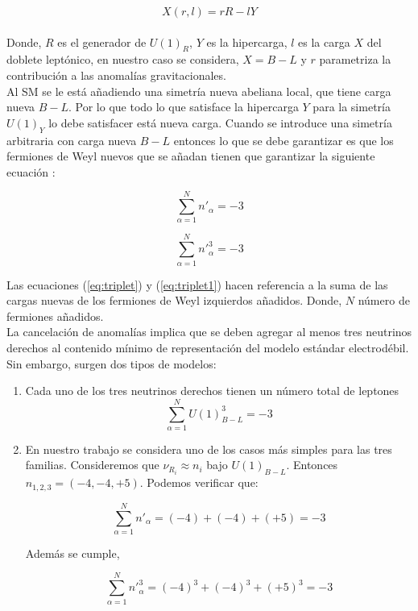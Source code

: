 \documentclass[12pt]{article}
\begin{document}
\begin{equation}
 X (r,l)=rR-lY   
\end{equation} \\

Donde, $R$ es el generador de $U(1)_R$, $Y $ es la hipercarga, $l$ es la carga $X$ del doblete leptónico, en nuestro caso se considera, $X={B-L}$ y $r$ parametriza la contribución a las anomalías gravitacionales. \\

Al SM se le está añadiendo una simetría nueva abeliana local, que tiene carga nueva ${B-L}$. Por lo que todo lo que satisface la hipercarga ${Y}$ para la simetría $U(1)_Y$ lo debe satisfacer está nueva carga. Cuando se introduce una simetría arbitraria con carga nueva ${B-L}$ entonces lo que se debe garantizar es que los fermiones de Weyl nuevos que se añadan tienen que garantizar la siguiente ecuación \cite{Restrepo}:


\begin{equation}
\label{eq:triplet}
    \sum_{\alpha=1}^N n'_{\alpha}=-3 
\end{equation}

\begin{equation}
\label{eq:triplet1}
    \sum_{\alpha=1}^N n'^{3}_{\alpha}=-3 
\end{equation}

Las ecuaciones (\ref{eq:triplet}) y (\ref{eq:triplet1}) hacen referencia a la suma de las cargas nuevas de los fermiones de Weyl izquierdos añadidos. Donde, $N$ número de fermiones añadidos. \\ 

La cancelación de anomalías implica que se deben agregar al menos tres neutrinos derechos al contenido mínimo de representación del modelo estándar electrodébil. Sin embargo, surgen dos tipos de modelos:

\begin{enumerate}
\item Cada uno de los tres neutrinos derechos tienen un número total de leptones 
\begin{equation}
\label{eq:triplet2}
    \sum_{\alpha=1}^N U(1)_{B-L}^{3}=-3 
\end{equation}
\item En nuestro trabajo se considera uno de los casos más simples para las tres familias. Consideremos que $\nu_{R_i} \approx n_i $ bajo $U(1)_{B-L}$. Entonces $n_{1,2,3}=(-4,-4,+5)$. Podemos verificar que:


\begin{equation}
\label{eq:triplet3}
    \sum_{\alpha=1}^N n'_{\alpha}=(-4) + (-4)+ (+5) = -3
\end{equation}

Además se cumple,  

\begin{equation}
\label{eq:triplet4}
    \sum_{\alpha=1}^N n'^{3}_{\alpha}=(-4)^3 + (-4)^3+ (+5)^3 = -3
\end{equation}
\end{enumerate}
\end{document}
